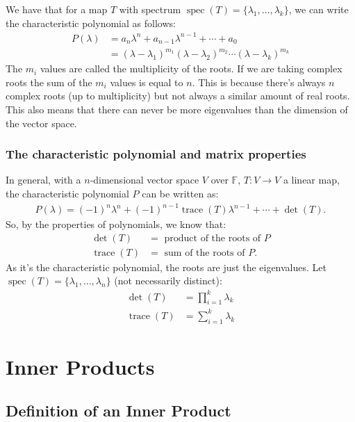 \documentclass[a4paper, 12pt, twoside]{article}
\DeclareMathOperator{\Tr}{trace}
\DeclareMathOperator{\Spec}{spec}
\begin{document}
We have that for a map $T$ with spectrum $\Spec(T) = \{\lambda_1,
\ldots, \lambda_k\}$, we can write the characteristic polynomial
as follows:
\begin{align*}
  P(\lambda) &= a_n\lambda^n + a_{n - 1}\lambda^{n-1} + \cdots + a_0 \\
  &= (\lambda - \lambda_1)^{m_1}(\lambda - \lambda_2)^{m_2}
    \cdots (\lambda - \lambda_k)^{m_k}
\end{align*}
The $m_i$ values are called the multiplicity of the roots. If we
are taking complex roots the sum of the $m_i$ values is
equal to $n$. This is because there's always $n$ complex roots (up
to multiplicity) but not always a similar amount of real roots.
This also means that there can never be more eigenvalues than the
dimension of the vector space.

\subsubsection{The characteristic polynomial and matrix properties}

In general, with a $n$-dimensional vector space $V$ over 
$\mathbb{F}$, $T:V \to V$ a linear map, the characteristic
polynomial $P$ can be written as:
\begin{align*}
  P(\lambda) = (-1)^n\lambda^n + (-1)^{n-1}\Tr(T)\lambda^{n-1}
  + \cdots + \det(T).
\end{align*}
So, by the properties of polynomials, we know that:
\begin{align*}
  \det(T) &= \text{ product of the roots of } P \\
  \Tr(T) &= \text{ sum of the roots of } P.
\end{align*}
As it's the characteristic polynomial, the roots are just the
eigenvalues. Let $\Spec(T) = \{\lambda_1, \ldots, \lambda_n\}$
(not necessarily distinct):
\begin{align*}
  \det(T) &= \prod_{i = 1}^k \lambda_k \\
  \Tr(T) &= \sum_{i = 1}^k \lambda_k
\end{align*}

\section{Inner Products}

\subsection{Definition of an Inner Product}
\end{document}
